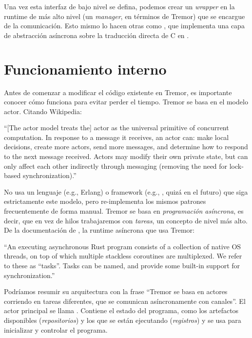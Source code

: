 Una vez esta interfaz de bajo nivel se defina, podemos crear un \emph{wrapper}
en la runtime de más alto nivel (un \emph{manager}, en términos de Tremor) que
se encargue de la comunicación. Esto mismo lo hacen otras \crates como
, que implementa una capa de abstracción asíncrona sobre la
traducción directa de C en .

\section{Funcionamiento interno}

Antes de comenzar a modificar el código existente en Tremor, es importante
conocer cómo funciona para evitar perder el tiempo. Tremor se basa en el modelo
actor. Citando Wikipedia:

``[The actor model treats the] actor as the universal primitive of concurrent
computation. In response to a message it receives, an actor can: make local
decisions, create more actors, send more messages, and determine how to respond
to the next message received. Actors may modify their own private state, but can
only affect each other indirectly through messaging (removing the need for
lock-based synchronization).''

No usa un lenguaje (e.g., Erlang) o framework (e.g., , quizá
en el futuro) que siga estrictamente este modelo, pero re-implementa los mismos
patrones frecuentemente de forma manual. Tremor se basa en \emph{programación
asíncrona}, es decir, que en vez de hilos trabajaremos con \emph{tareas}, un
concepto de nivel más alto. De la documentación de , la
runtime asíncrona que usa Tremor:

``An executing asynchronous Rust program consists of a collection of native OS
threads, on top of which multiple stackless coroutines are multiplexed. We refer
to these as “tasks”. Tasks can be named, and provide some built-in support for
synchronization.''

Podríamos resumir su arquitectura con la frase ``Tremor se basa en actores
corriendo en tareas diferentes, que se comunican asíncronamente con canales''.
El actor principal se llama . Contiene el estado del programa, como
los artefactos disponibles (\emph{repositorios}) y los que se están ejecutando
(\emph{registros}) y se usa para inicializar y controlar el programa.

